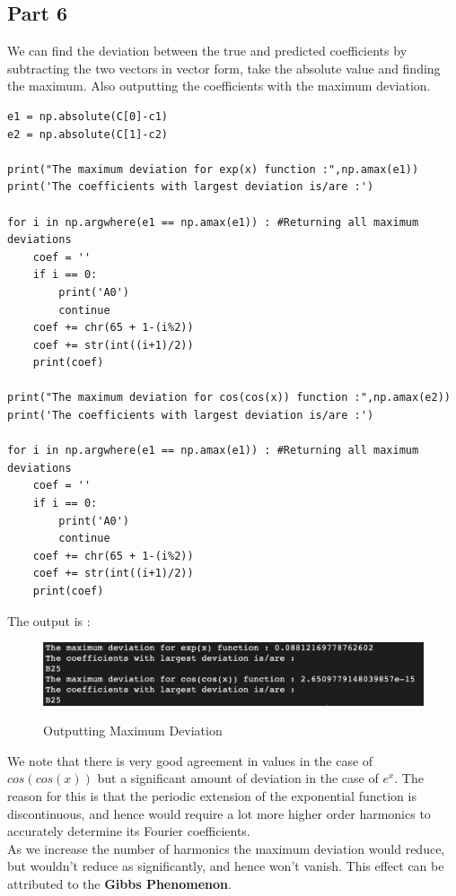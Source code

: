 \documentclass[11pt, a4paper]{article}
\begin{document}
\subsection{Part 6}
We can find the deviation between the true and predicted coefficients by subtracting the two vectors in vector form, take the absolute value and finding the maximum. Also outputting the coefficients with the maximum deviation.
\begin{verbatim}
e1 = np.absolute(C[0]-c1)
e2 = np.absolute(C[1]-c2)

print("The maximum deviation for exp(x) function :",np.amax(e1))
print('The coefficients with largest deviation is/are :')

for i in np.argwhere(e1 == np.amax(e1)) : #Returning all maximum deviations
	coef = ''
	if i == 0:
		print('A0')
		continue
	coef += chr(65 + 1-(i%2))
	coef += str(int((i+1)/2))
	print(coef)

print("The maximum deviation for cos(cos(x)) function :",np.amax(e2))
print('The coefficients with largest deviation is/are :')

for i in np.argwhere(e1 == np.amax(e1)) : #Returning all maximum deviations
	coef = ''
	if i == 0:
		print('A0')
		continue
	coef += chr(65 + 1-(i%2))
	coef += str(int((i+1)/2))
	print(coef)
\end{verbatim}
The output is :
\begin{figure}[H]
   	\centering
   	\includegraphics[scale=0.5]{out.png}
   	\label{fig:out}
   	\caption{Outputting Maximum Deviation}
\end{figure}
{We note that there is very good agreement in values in the case of $cos(cos(x))$ but a significant amount of deviation in the case of $e^{x}$. The reason for this is that the periodic extension of the exponential function is discontinuous, and hence would require a lot more higher order harmonics to accurately determine its Fourier coefficients.
\\
As we increase the number of harmonics the maximum deviation would reduce, but wouldn't reduce as significantly, and hence won't vanish.
This effect can be attributed to the \textbf{Gibbs Phenomenon}.
}
\end{document}
